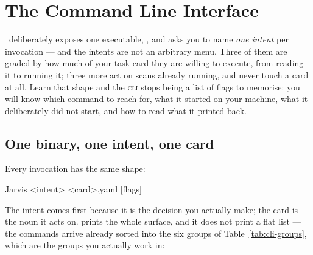 \chapter{The Command Line Interface}
\label{ch:cli}

 \Jtwo\ deliberately
exposes one executable, , and asks you to name \emph{one intent} per
invocation --- and the intents are not an arbitrary menu. Three of them are graded by how
much of your task card they are willing to execute, from reading it to running it; three
more act on scans already running, and never touch a card at all. Learn that shape and the
\textsc{cli} stops being a list of flags to memorise: you will know which command to reach
for, what it started on your machine, what it deliberately did not start, and how to read
what it printed back.

\section{One binary, one intent, one card}
\label{sec:cli-shape}

Every invocation has the same shape:

\begin{terminal}
\begin{jcmd}
Jarvis <intent> <card>.yaml [flags]
\end{jcmd}
\end{terminal}

The intent comes first because it is the decision you actually make; the card is the
noun it acts on.  prints the whole surface, and it does not print a flat
list --- the commands arrive already sorted into the six groups of
Table~\ref{tab:cli-groups}, which are the groups you actually work in:

